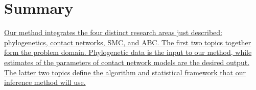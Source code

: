 %

\section{Summary}

{\color{blue}\uline{ Our method integrates the four distinct research areas
  just described: phylogenetics, contact networks, \acrlong{SMC}, and
  \acrlong{ABC}. The first two topics together form the problem domain.
  Phylogenetic data is the input to our method, while estimates of the
  parameters of contact network models are the desired output. The latter two
  topics define the algorithm and statistical framework that our inference
method will use. }}
